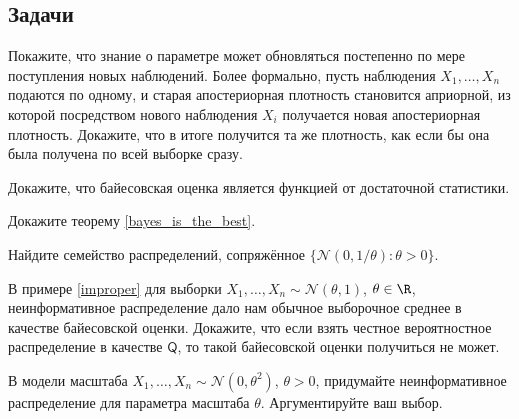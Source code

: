 
\subsection*{Задачи}

\begin{problem}
    Покажите, что знание о параметре может обновляться постепенно по мере поступления новых наблюдений. Более формально, пусть наблюдения $X_1, \ldots, X_n$ подаются по одному, и старая апостериорная плотность становится априорной, из которой посредством нового наблюдения $X_i$ получается новая апостериорная плотность. Докажите, что в итоге получится та же плотность, как если бы она была получена по всей выборке сразу.
\end{problem}

\begin{problem}
    Докажите, что байесовская оценка является функцией от достаточной статистики.
\end{problem}

\begin{problem}
    Докажите теорему \ref{bayes_is_the_best}.
\end{problem}

\begin{problem}
    Найдите семейство распределений, сопряжённое $\{\mathcal{N}(0, 1/\theta)\colon \theta > 0\}$.
\end{problem}

\begin{problem}
    В примере \ref{improper} для выборки $X_1, \ldots, X_n \sim \mathcal{N}(\theta, 1)$, $\theta \in \R$, неинформативное распределение дало нам обычное выборочное среднее в качестве байесовской оценки. Докажите, что если взять честное вероятностное распределение в качестве $\mathsf{Q}$, то такой байесовской оценки получиться не может.
\end{problem}

\begin{problem}
    В модели масштаба $X_1, \ldots, X_n \sim \mathcal{N}(0, \theta^2)$, $\theta > 0$, придумайте неинформативное распределение для параметра масштаба $\theta$. Аргументируйте ваш выбор. 
\end{problem}




 
